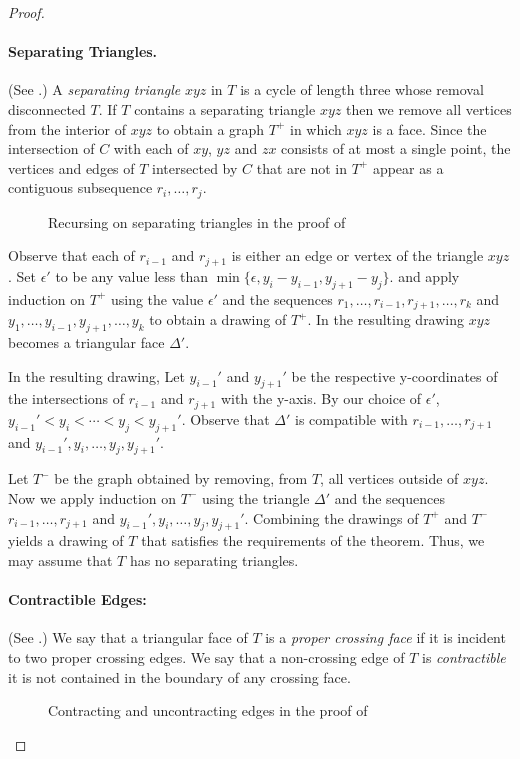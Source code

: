 \documentclass{patmorin}
\begin{document}
\begin{proof}
   \paragraph{Separating Triangles.}
   (See .)
   A \emph{separating triangle} $xyz$ in $T$ is a cycle of length three
   whose removal disconnected $T$.  If $T$ contains a separating triangle
   $xyz$ then we remove all vertices from the interior of $xyz$ to obtain
   a graph $T^+$ in which $xyz$ is a face.  Since the intersection of $C$
   with each of $xy$, $yz$ and $zx$ consists of at most a single point,
   the vertices and edges of $T$ intersected by $C$ that are not in $T^+$
   appear as a contiguous subsequence $r_i,\ldots,r_j$.

   \begin{figure}
      \caption{Recursing on separating triangles in the proof of
      }
   \end{figure}

   Observe that each of $r_{i-1}$ and $r_{j+1}$ is either an edge
   or vertex of the triangle $xyz$.  Set $\epsilon'$ to be any
   value less than $\min\{\epsilon,y_{i}-y_{i-1}, y_{j+1}-y_j\}$.
   and apply induction on $T^+$ using the value $\epsilon'$
   and the sequences $r_1,\ldots,r_{i-1},r_{j+1},\ldots,r_k$ and
   $y_1,\ldots,y_{i-1},y_{j+1},\ldots,y_k$ to obtain a drawing of $T^+$.
   In the resulting drawing $xyz$ becomes a triangular face $\Delta'$.

   In the resulting drawing, Let $y_{i-1}'$ and $y_{j+1}'$
   be the respective y-coordinates of the intersections of
   $r_{i-1}$ and $r_{j+1}$ with the y-axis.  By our choice of
   $\epsilon'$, $y_{i-1}'<y_i<\cdots<y_j<y_{j+1}'$.  Observe that
   $\Delta'$ is compatible with $r_{i-1},\ldots,r_{j+1}$ and
   $y_{i-1}',y_i,\ldots,y_j,y_{j+1}'$.

   Let $T^-$ be the graph obtained by removing, from $T$, all
   vertices outside of $xyz$.  Now we apply induction on $T^-$ using
   the triangle $\Delta'$ and the sequences $r_{i-1},\ldots,r_{j+1}$ and
   $y_{i-1}',y_i,\ldots,y_{j},y_{j+1}'$.  Combining the drawings of $T^+$
   and $T^-$ yields a drawing of $T$ that satisfies the requirements of
   the theorem.  Thus, we may assume that $T$ has no separating triangles.

   \paragraph{Contractible Edges:}
   (See .)
   We say that a triangular face of $T$ is a \emph{proper crossing
   face} if it is incident to two proper crossing edges.  We say that a
   non-crossing edge of $T$ is \emph{contractible} it is not contained
   in the boundary of any crossing face.  
   \begin{figure}
      \caption{Contracting and uncontracting edges in the proof of
      }
   \end{figure}


\end{proof}
\end{document}
